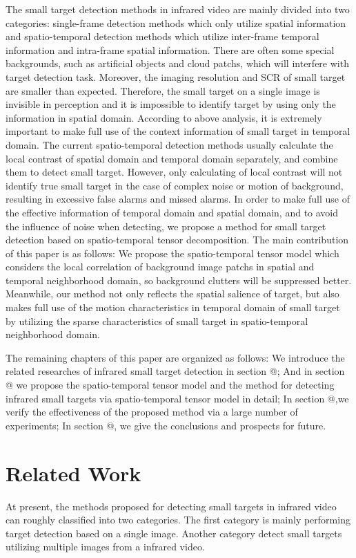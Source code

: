 \documentclass[journal]{IEEEtran}
\makeatletter
\newcommand{\Rmnum}[1]{\expandafter\@slowromancap\romannumeral #1@}
\makeatother
\begin{document}
The small target detection methods in infrared video are mainly divided into two categories: single-frame detection methods which only utilize spatial information and spatio-temporal detection methods which utilize inter-frame temporal information and intra-frame spatial information\cite{li2016novel}. There are often some special backgrounds, such as artificial objects and cloud patchs, which will interfere with target detection task. Moreover, the imaging resolution and SCR of small target are smaller than expected. Therefore, the small target on a single image is invisible in perception and it is impossible to identify target by using only the information in spatial domain. According to above analysis, it is extremely important to make full use of the context information of small target in temporal domain. The current spatio-temporal detection methods usually calculate the local contrast of spatial domain and temporal domain separately, and combine them to detect small target. However, only calculating of local contrast will not identify true small target in the case of complex noise or motion of background, resulting in excessive false alarms and missed alarms. In order to make full use of the effective information of temporal domain and spatial domain, and to avoid the influence of noise when detecting, we propose a method for small target detection based on spatio-temporal tensor decomposition. The main contribution of this paper is as follows: We propose the spatio-temporal tensor model which considers the local correlation of background image patchs in spatial and temporal neighborhood domain, so background clutters will be suppressed better. Meanwhile, our method not only reflects the spatial salience of target, but also makes full use of the motion characteristics in temporal domain of small target by utilizing the sparse characteristics of small target in spatio-temporal neighborhood domain.

The remaining chapters of this paper are organized as follows: We introduce the related researches of infrared small target detection in section \Rmnum{2}; And in section \Rmnum{3} we propose the spatio-temporal tensor model and the method for detecting infrared small targets via spatio-temporal tensor model in detail; In section \Rmnum{4},we verify the effectiveness of the proposed method via a large number of experiments; In section \Rmnum{5}, we give the conclusions and prospects for future.

%
%
\section{Related Work}
At present, the methods proposed for detecting small targets in infrared video can roughly classified into two categories. The first category is mainly performing target detection based on a single image. Another category detect small targets utilizing multiple images from a infrared video.
\end{document}

